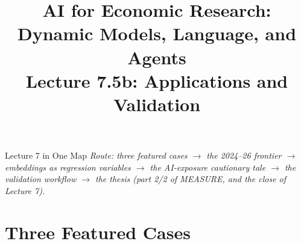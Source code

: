 



\graphicspath{{./pic/}{../../MiniCourse_8hr/Slides/Module3_LLM_Text/pic/}{../}}

\usetikzlibrary{arrows.meta, positioning, shapes.geometric, fit, backgrounds}



\title[AI for Econ Research]{AI for Economic Research: Dynamic Models, Language, and Agents\\
Lecture 7.5b: Applications and Validation}



\makebeamertitle

\begin{frame}{Lecture 7 in One Map}
\medskip
\textit{\footnotesize Route: three featured cases $\to$ the 2024--26 frontier $\to$ embeddings as regression variables $\to$ the AI-exposure cautionary tale $\to$ the validation workflow $\to$ the thesis (part 2/2 of MEASURE, and the close of Lecture 7).}
\end{frame}

\section{Three Featured Cases}


